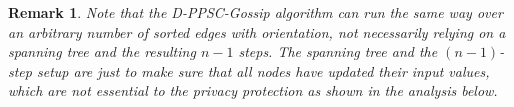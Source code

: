 \documentclass[a4paper, 11pt]{article}
\newcommand{\1}{\mathbf{1}}
\newtheorem{remark}{Remark}
\begin{document}
\begin{remark}{\rm 
Note that the D-PPSC-Gossip algorithm can run the same way over an arbitrary number of sorted  edges with orientation, not necessarily relying on a spanning tree and the resulting $n-1$ steps. The spanning tree and the $(n-1)$-step setup are just to make sure that all nodes have updated their input values, which are not essential to the privacy protection as shown in the analysis below.  }
\end{remark}


\end{document}
